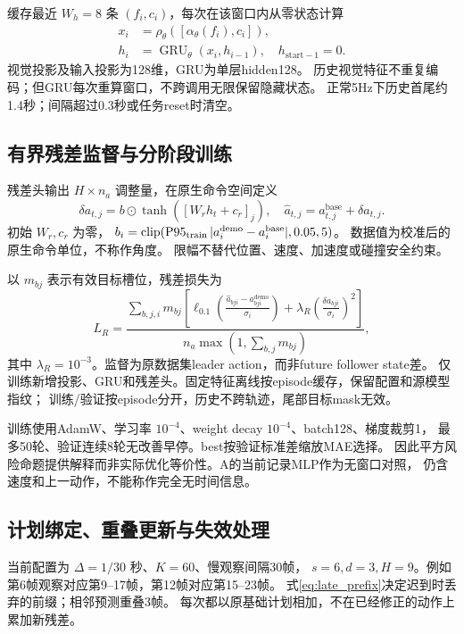 缓存最近 $W_h=8$ 条 $(f_i,c_i)$，每次在该窗口内从零状态计算
\begin{align}
 x_i&=\rho_\theta([\alpha_\theta(f_i),c_i]),\nonumber\\
 h_i&=\operatorname{GRU}_\theta(x_i,h_{i-1}),\quad h_{\mathrm{start}-1}=0.
 \label{eq:gru}
\end{align}
视觉投影及输入投影为128维，GRU为单层hidden128。
历史视觉特征不重复编码；但GRU每次重算窗口，不跨调用无限保留隐藏状态。
正常5Hz下历史首尾约1.4秒；间隔超过0.3秒或任务reset时清空。

\subsection{有界残差监督与分阶段训练}

残差头输出 $H\times n_a$ 调整量，在原生命令空间定义
\begin{equation}
 \delta a_{t,j}=b\odot\tanh([W_r h_t+c_r]_j),
 \quad \widehat a_{t,j}=a^{\mathrm{base}}_{t,j}+\delta a_{t,j}.
\end{equation}
初始 $W_r,c_r$ 为零，
$b_i=\operatorname{clip}(\operatorname{P95}_{\mathrm{train}}|a_i^{\mathrm{demo}}-a_i^{\mathrm{base}}|,0.05,5)$。
数据值为校准后的原生命令单位，不称作角度。
限幅不替代位置、速度、加速度或碰撞安全约束。

以 $m_{bj}$ 表示有效目标槽位，残差损失为
\begin{equation}
 L_R=\frac{\sum_{b,j,i}m_{bj}
 \left[\ell_{0.1}\!\left(\frac{\widehat a_{bji}-a^{\mathrm{demo}}_{bji}}{\sigma_i}\right)
 +\lambda_R\left(\frac{\delta a_{bji}}{\sigma_i}\right)^2\right]}
 {n_a\max(1,\sum_{b,j}m_{bj})},
 \label{eq:residual_loss}
\end{equation}
其中 $\lambda_R=10^{-3}$。监督为原数据集leader action，而非future follower state差。
仅训练新增投影、GRU和残差头。固定特征离线按episode缓存，保留配置和源模型指纹；
训练/验证按episode分开，历史不跨轨迹，尾部目标mask无效。

训练使用AdamW、学习率 $10^{-4}$、weight decay $10^{-4}$、batch128、梯度裁剪1，
最多50轮、验证连续8轮无改善早停。best按验证标准差缩放MAE选择。
因此平方风险命题提供解释而非实际优化等价性。A的当前记录MLP作为无窗口对照，
仍含速度和上一动作，不能称作完全无时间信息。

\subsection{计划绑定、重叠更新与失效处理}

当前配置为 $\Delta=1/30$ 秒、$K=60$、慢观察间隔30帧，
$s=6,d=3,H=9$。例如第6帧观察对应第9--17帧，第12帧对应第15--23帧。
式\eqref{eq:late_prefix}决定迟到时丢弃的前缀；相邻预测重叠3帧。
每次都以原基础计划相加，不在已经修正的动作上累加新残差。

